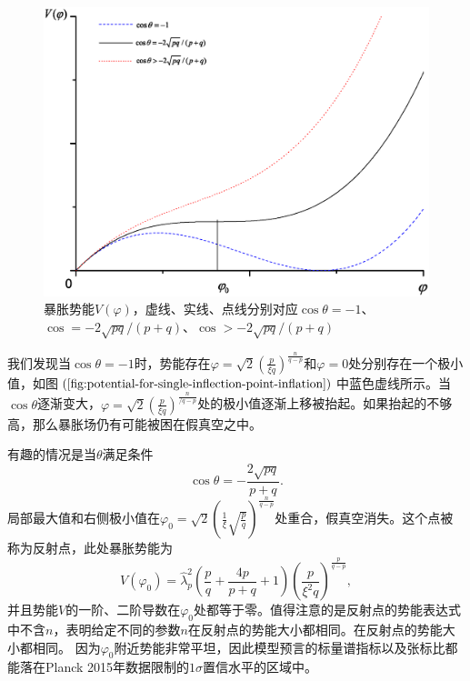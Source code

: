 \begin{figure}
  \centering
  \includegraphics[width=5in]{Img/Graph1.eps}
  \caption{暴胀势能$V(\varphi)$，虚线、实线、点线分别对应$\cos\theta=-1$、$\cos=-2\sqrt{pq}/(p+q)$、$\cos>-2\sqrt{pq}/(p+q)$}\label{fig:potential-for-single-inflection-point-inflation}
\end{figure}

我们发现当$\cos\theta =
-1$时，势能存在$\varphi=\sqrt{2}{\left(\frac{p}{\xi
q}\right)}^{\frac{n}{q-p}}$和$\varphi=0$处分别存在一个极小值，如图$(\ref{fig:potential-for-single-inflection-point-inflation})$中蓝色虚线所示。当$\cos\theta$逐渐变大，$\varphi=\sqrt{2}{\left(\frac{p}{\xi
q}\right)}^{\frac{n}{/q-p}}$处的极小值逐渐上移被抬起。如果抬起的不够高，那么暴胀场仍有可能被困在假真空之中。

有趣的情况是当$\theta$满足条件
\begin{equation}
  \label{eq:inflection-point-condition}
  \cos\theta = - \frac{2\sqrt{pq}}{p+q}. 
\end{equation}
局部最大值和右侧极小值在$\varphi_0=\sqrt{2}{\left(\frac{1}{\xi}\sqrt{\frac{p}{q}}\right)}^{\frac{n}{q-p}}$处重合，假真空消失。这个点被称为反射点，此处暴胀势能为
\begin{equation}
  V(\varphi_0) = \hat{\lambda}^2_{p} \left( \frac{p}{q}+\frac{4p}{p+q}+1\right)
  {\left(\frac{p}{\xi^2 q}\right)}^{\frac{p}{q-p}},
\end{equation}
并且势能$V$的一阶、二阶导数在$\varphi_0$处都等于零。值得注意的是反射点的势能表达式中不含$n$，表明给定不同的参数$n$在反射点的势能大小都相同。在反射点的势能大小都相同。
因为$\varphi_0$附近势能非常平坦，因此模型预言的标量谱指标以及张标比都能落在Planck
2015年数据限制的$1\sigma$置信水平的区域中。


